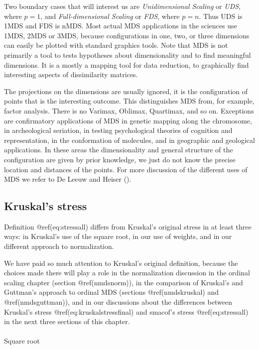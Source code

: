 \documentclass[
  12pt,
  letterpaper,
  DIV=11,
  numbers=noendperiod]{scrartcl}
\makeatletter
\let\oldparagraph\paragraph
\renewcommand{\paragraph}{
    \@ifstar
      \xxxParagraphStar
      \xxxParagraphNoStar
  }
\newcommand{\xxxParagraphStar}[1]{\oldparagraph*{#1}\mbox{}}
\newcommand{\xxxParagraphNoStar}[1]{\oldparagraph{#1}\mbox{}}
\makeatother
\begin{document}
Two boundary cases that will interest us are \emph{Unidimensional
Scaling} or \emph{UDS}, where \(p=1\), and \emph{Full-dimensional
Scaling} or \emph{FDS}, where \(p=n\). Thus UDS is 1MDS and FDS is nMDS.
Most actual MDS applications in the sciences use 1MDS, 2MDS or 3MDS,
because configurations in one, two, or three dimensions can easily be
plotted with standard graphics tools. Note that MDS is not primarily a
tool to tests hypotheses about dimensionality and to find meaningful
dimensions. It is a mostly a mapping tool for data reduction, to
graphically find interesting aspects of dissimilarity matrices.

The projections on the dimensions are usually ignored, it is the
configuration of points that is the interesting outcome. This
distinguishes MDS from, for example, factor analysis. There is no
Varimax, Oblimax, Quartimax, and so on. Exceptions are confirmatory
applications of MDS in genetic mapping along the chromosome, in
archeological seriation, in testing psychological theories of cognition
and representation, in the conformation of molecules, and in geographic
and geological applications. In these areas the dimensionality and
general structure of the configuration are given by prior knowledge, we
just do not know the precise location and distances of the points. For
more discussion of the different uses of MDS we refer to De Leeuw and
Heiser ().

\subsection{Kruskal's stress}\label{kruskals-stress}

Definition @ref(eq:stressall) differs from Kruskal's original stress in
at least three ways: in Kruskal's use of the square root, in our use of
weights, and in our different approach to normalization.

We have paid so much attention to Kruskal's original definition, because
the choices made there will play a role in the normalization discussion
in the ordinal scaling chapter (section @ref(nmdsnorm)), in the
comparison of Kruskal's and Guttman's approach to ordinal MDS (sections
@ref(nmdskruskal) and @ref(nmdsguttman)), and in our discussions about
the differences between Kruskal's stress @ref(eq:kruskalstressfinal) and
smacof's stress @ref(eq:stressall) in the next three sections of this
chapter.

\paragraph{Square root}\label{square-root}
\end{document}
